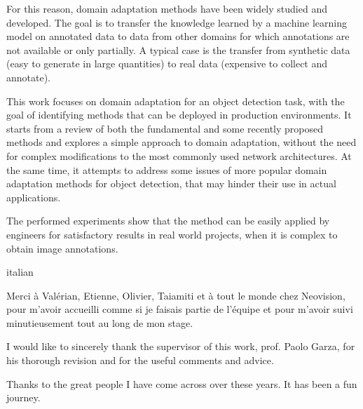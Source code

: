 \documentclass[%
    corpo=12pt,
    twoside,
    stile=classica,   
    tipotesi=magistrale,
    evenboxes,
    english,
	numerazioneromana,
]{toptesi}
\begin{document}
For this reason, domain adaptation methods have been widely studied and developed. The goal is to transfer the knowledge learned by a machine learning model on annotated data to data from other domains for which annotations are not available or only partially. A typical case is the transfer from synthetic data (easy to generate in large quantities) to real data (expensive to collect and annotate).

\bigskip
This work focuses on domain adaptation for an object detection task, with the goal of identifying methods that can be deployed in production environments. It starts from a review of both the fundamental and some recently proposed methods and explores a simple approach to domain adaptation, without the need for complex modifications to the most commonly used network architectures. At the same time, it attempts to address some issues of more popular domain adaptation methods for object detection, that may hinder their use in actual applications.

The performed experiments show that the method can be easily applied by engineers for satisfactory results in real world projects, when it is complex to obtain image annotations.

\paginavuota %

\ringraziamenti
\begin{otherlanguage*}{italian}
\end{otherlanguage*}

\vspace*{1cm}

\bigskip
\foreignlanguage{french}{Merci à Valérian, Etienne, Olivier, Taiamiti et à tout le monde chez Neovision, pour m'avoir accueilli comme si je faisais partie de l'équipe et pour m'avoir suivi minutieusement tout au long de mon stage.}

\bigskip
I would like to sincerely thank the supervisor of this work, prof. Paolo Garza, for his thorough revision and for the useful comments and advice.

\bigskip
Thanks to the great people I have come across over these years. It has been a fun journey.

\newpage
\end{document}
